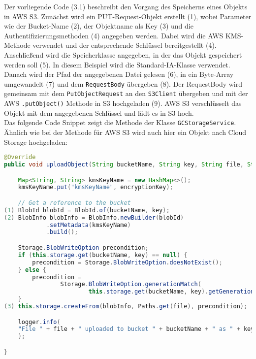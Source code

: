 \newpage

Der vorliegende Code (3.1) beschreibt den Vorgang des Speicherns eines Objekts in AWS S3. Zunächst wird ein PUT-Request-Objekt erstellt (1), wobei Parameter wie der Bucket-Name (2), der Objektname als Key (3) und die Authentifizierungsmethoden (4) angegeben werden. Dabei wird die AWS KMS-Methode verwendet und der entsprechende Schlüssel bereitgestellt (4). Anschließend wird die Speicherklasse angegeben, in der das Objekt gespeichert werden soll (5). In diesem Beispiel wird die Standard-IA-Klasse verwendet. Danach wird der Pfad der angegebenen Datei gelesen (6), in ein Byte-Array umgewandelt (7) und dem \verb|RequestBody| übergeben (8). Der RequestBody wird gemeinsam mit dem \verb|PutObjectRequest| an den \verb|S3Client| übergeben und mit der AWS \verb|.putObject()| Methode in S3 hochgeladen (9). AWS S3 verschlüsselt das Objekt mit dem angegebenen Schlüssel und lädt es in S3 hoch.\\

Das folgende Code Snippet zeigt die Methode der Klasse \verb|GCStorageService|. Ähnlich wie bei der Methode für AWS S3 wird auch hier ein Objekt nach Cloud Storage hochgeladen:

\begin{lstlisting}[language=Java, caption=Prototyp Code Snippet - Hochladen eines Objekts nach Cloud Storage]
@Override
public void uploadObject(String bucketName, String key, String file, String encryptionKey, String storageClass) throws IOException {

    Map<String, String> kmsKeyName = new HashMap<>();
    kmsKeyName.put("kmsKeyName", encryptionKey);

    // Get a reference to the bucket
(1) BlobId blobId = BlobId.of(bucketName, key);
(2) BlobInfo blobInfo = BlobInfo.newBuilder(blobId)
            .setMetadata(kmsKeyName)
            .build();

    Storage.BlobWriteOption precondition;
    if (this.storage.get(bucketName, key) == null) {
        precondition = Storage.BlobWriteOption.doesNotExist();
    } else {
        precondition =
                Storage.BlobWriteOption.generationMatch(
                        this.storage.get(bucketName, key).getGeneration());
    }
(3) this.storage.createFrom(blobInfo, Paths.get(file), precondition);

    logger.info(
    "File " + file + " uploaded to bucket " + bucketName + " as " + key
    );

}
\end{lstlisting}

